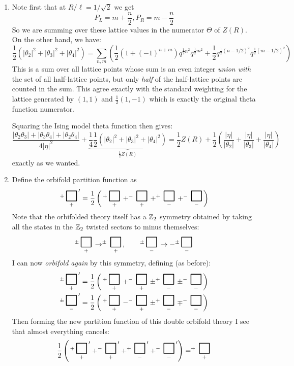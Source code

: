 \documentclass[11pt]{article}
\begin{document}
\begin{enumerate}
	\item Note first that at $R/\ell = 1/\sqrt{2}$ we get \[
		P_L = m + \frac{n}{2}, P_R = m - \frac{n}{2}
	\]
	So we are summing over these lattice values in the numerator $\Theta$ of $Z(R)$. On the other hand, we have:
	\[
		\frac12(|\theta_2|^2 + |\theta_3|^2 + |\theta_4|^2) = \sum_{n, m} \left( \frac12 (1 + (-1)^{n+m}) q^{\frac12 n^2} \bar q^{\frac12 m^2} + \frac12 q^{\frac12 (n-1/2)^2} \bar q^{\frac12 (m-1/2)^2}  \right)
	\]
	This is a sum over all lattice points whose sum is an even integer \emph{union with} the set of all half-lattice points, but only \emph{half} of the half-lattice points are counted in the sum. This agree exactly with the standard weighting for the lattice generated by $(1, 1)$ and $\frac12 (1, -1)$ which is exactly the original theta function numerator. 
	
	Squaring the Ising model theta function then gives:
	\[
		\frac{|\theta_2 \theta_3| + |\theta_3 \theta_4| + |\theta_2 \theta_4|}{4|\eta|^2} + \underbrace{\frac14 \frac12(|\theta_2|^2 + |\theta_3|^2 + |\theta_4|^2)}_{\frac12 Z(R)} = \frac12 Z(R) + \frac12 \left(\frac{|\eta|}{|\theta_2|} + \frac{|\eta|}{|\theta_3|} + \frac{|\eta|}{|\theta_4|} \right)
	\]
	exactly as we wanted. 
	
	\item Define the orbifold partition function as
		\[
			^+\underset{+}{\BoxPlz}' = \frac12 \left( \,^+\underset{+}{\BoxPlz} + ^-\underset{+}{\BoxPlz} + ^+\underset{-}{\BoxPlz} + ^-\underset{-}{\BoxPlz} \right)
		\]
		Note that the orbifolded theory itself has a $\mathbb{Z}_2$ symmetry obtained by taking all the states in the $\mathbb{Z}_2$ twisted sectors to minus themselves:
		\[
			^\pm\underset{+}{\BoxPlz} \to ^\pm\underset{+}{\BoxPlz}, \qquad ^\pm\underset{-}{\BoxPlz} \to - ^\pm\underset{-}{\BoxPlz}
		\]
		I can now \emph{orbifold again} by this symmetry, defining (as before):
		\[
		\begin{aligned}
			&^\pm\underset{+}{\BoxPlz}' = \frac12 \left( \,^+\underset{+}{\BoxPlz} + ^-\underset{+}{\BoxPlz} \pm ^+\underset{-}{\BoxPlz} \pm ^-\underset{-}{\BoxPlz} \right)\\
			& ^\pm\underset{-}{\BoxPlz}' = \frac12 \left( \,^+\underset{+}{\BoxPlz} - ^-\underset{+}{\BoxPlz} \pm ^+\underset{-}{\BoxPlz} \mp ^-\underset{-}{\BoxPlz} \right)
		\end{aligned}
		\]
		Then forming the new partition function of this double orbifold theory I see that almost everything cancels:
		\[
			\frac12 \left( \,^+\underset{+}{\BoxPlz}' + ^-\underset{+}{\BoxPlz}' + ^+\underset{-}{\BoxPlz}' + ^-\underset{-}{\BoxPlz}' \right) = ^+\underset{+}{\BoxPlz}
		\]


\end{enumerate}
\end{document}
